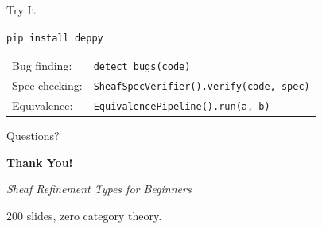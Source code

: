 \documentclass[aspectratio=169,10pt]{beamer}
\begin{document}
\begin{frame}{Try It}
\begin{center}
\Large
\texttt{pip install deppy}
\vspace{1em}

\normalsize
\begin{tabular}{@{}ll@{}}
Bug finding:       & \texttt{detect\_bugs(code)} \\
Spec checking:     & \texttt{SheafSpecVerifier().verify(code, spec)} \\
Equivalence:       & \texttt{EquivalencePipeline().run(a, b)} \\
\end{tabular}

\vspace{1em}
\Large
Questions?
\end{center}
\end{frame}

\begin{frame}{}
\begin{center}
\Huge\bfseries
Thank You!
\vspace{1em}

\Large
\textit{Sheaf Refinement Types for Beginners}
\vspace{0.5em}

\normalsize
200 slides, zero category theory.
\end{center}
\end{frame}
\end{document}
